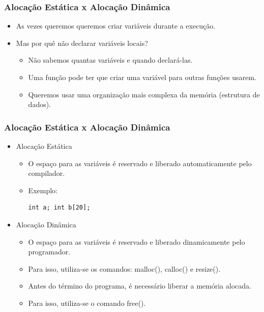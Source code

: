 \documentclass[aspectratio=169]{beamer}
\begin{document}
\begin{frame}
\frametitle{Alocação Estática x Alocação Dinâmica}
\begin{itemize}
\item As vezes queremos queremos criar variáveis durante a execução.
\item Mas por quê não declarar variáveis locais?
\begin{itemize}
\item Não sabemos quantas variáveis e quando declará-las.
\item Uma função pode ter que criar uma variável para outras funções usarem.
\item Queremos usar uma organização mais complexa da memória (estrutura de dados).
\end{itemize}
\end{itemize}
\end{frame}


\begin{frame}[fragile]
\frametitle{Alocação Estática x Alocação Dinâmica}
\begin{itemize}
\item Alocação Estática
\begin{itemize}
\item O espaço para as variáveis é reservado e liberado automaticamente pelo compilador.
\item Exemplo:
\begin{lstlisting}
int a; int b[20];
\end{lstlisting}
\end{itemize}
\item Alocação Dinâmica
\begin{itemize}
\item O espaço para as variáveis é reservado e liberado dinamicamente pelo programador.
\item Para isso, utiliza-se os comandos: malloc(), calloc() e resize().
\item Antes do término do programa, é necessário liberar a memória alocada.
\item Para isso, utiliza-se o comando free().
\end{itemize}
\end{itemize}
\end{frame}

\end{document}

